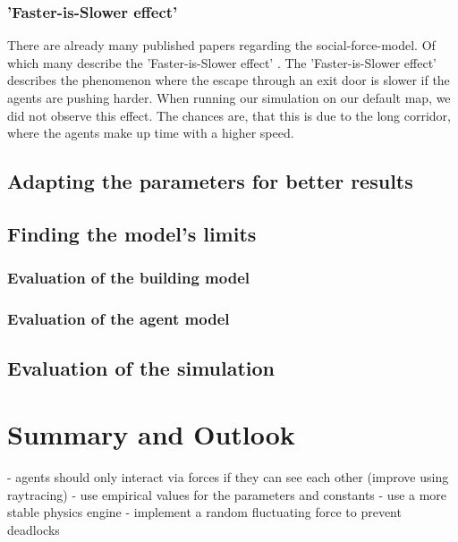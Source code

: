 \documentclass[11pt]{article}
\begin{document}
\subsubsection{'Faster-is-Slower effect'}
There are already many published papers regarding the social-force-model. Of which many describe the 'Faster-is-Slower effect' \cite{Helbing, Wang}. The 'Faster-is-Slower effect' describes the phenomenon where the escape through an exit door is slower if the agents are pushing harder. When running our simulation on our default map, we did not observe this effect. The chances are, that this is due to the long corridor, where the agents make up time with a higher speed.

\subsection{Adapting the parameters for better results}

\subsection{Finding the model's limits}


\subsubsection{Evaluation of the building model}
\subsubsection{Evaluation of the agent model}

\subsection{Evaluation of the simulation}

\section{Summary and Outlook}
- agents should only interact via forces if they can see each other (improve using raytracing)
- use empirical values for the parameters and constants
- use a more stable physics engine
- implement a random fluctuating force to prevent deadlocks





\end{document}
